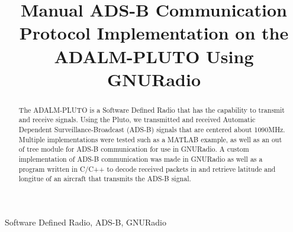 \documentclass[conference, onecolumn]{IEEEtran}
\begin{document}
\title{Manual ADS-B Communication Protocol Implementation on the ADALM-PLUTO Using GNURadio}

\author{
\and
}

\maketitle

\begin{IEEEkeywords}
  Software Defined Radio, ADS-B, GNURadio
\end{IEEEkeywords}

\begin{abstract}
  The ADALM-PLUTO is a Software Defined Radio that has the capability to transmit and receive signals. Using the Pluto, we transmitted and received Automatic Dependent Surveillance-Broadcast (ADS-B) signals that are centered about 1090MHz. Multiple implementations were tested such as a MATLAB example, as well as an out of tree module for ADS-B communication for use in GNURadio. A custom implementation of ADS-B communication was made in GNURadio as well as a program written in C/C++ to decode received packets in and retrieve latitude and longitue of an aircraft that transmits the ADS-B signal.
\end{abstract}
\end{document}
